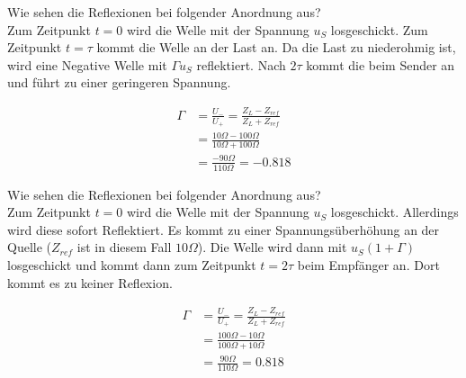 \begin{karte}{Wie sehen die Reflexionen bei folgender Anordnung aus?\\
		\scalebox{.8}{}}
	Zum Zeitpunkt $t=0$ wird die Welle mit der Spannung $u_S$ losgeschickt. Zum Zeitpunkt $t=\tau$ kommt die Welle an der Last an. Da die Last zu niederohmig ist, wird eine Negative Welle mit $\Gamma u_S$ reflektiert. Nach $2\tau$ kommt die  beim Sender an und führt zu einer geringeren Spannung.\\
	\begin{minipage}{0.59\textwidth}
		\scalebox{.75}{}
	\end{minipage}
	\begin{minipage}{0.39\textwidth}
		\begin{align*}
		\Gamma &= \frac{U_-}{U_+} = \frac{Z_L-Z_{ref}}{Z_L+Z_{ref}}\\
		&= \frac{10\Omega-100\Omega}{10\Omega+100\Omega}\\
		&= \frac{-90\Omega}{110\Omega} = -0.818
		\end{align*}
	\end{minipage}
\end{karte}

\begin{karte}{Wie sehen die Reflexionen bei folgender Anordnung aus?\\
		\scalebox{.8}{}}
	Zum Zeitpunkt $t=0$ wird die Welle mit der Spannung $u_S$ losgeschickt. Allerdings wird diese sofort Reflektiert. Es kommt zu einer Spannungsüberhöhung an der Quelle ($Z_{ref}$ ist in diesem Fall $10\Omega$). Die Welle wird dann mit $u_S (1+\Gamma)$ losgeschickt und kommt dann zum Zeitpunkt $t=2\tau$ beim Empfänger an. Dort kommt es zu keiner Reflexion.\\
	\begin{minipage}{0.59\textwidth}
		\scalebox{.75}{}
	\end{minipage}
	\begin{minipage}{0.39\textwidth}
		\begin{align*}
		\Gamma &= \frac{U_-}{U_+} = \frac{Z_L-Z_{ref}}{Z_L+Z_{ref}}\\
		&= \frac{100\Omega-10\Omega}{100\Omega+10\Omega}\\
		&= \frac{90\Omega}{110\Omega} = 0.818
		\end{align*}
	\end{minipage}
\end{karte}
